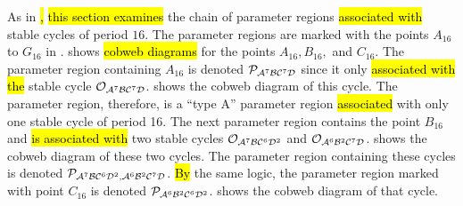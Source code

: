 As in\hl{ }\cite{akyuz2022}\hl{,} \hl{this section examines} the chain of parameter regions \hl{associated with} stable cycles of period $16$.
The parameter regions are marked with the points $A_{16}$ to $G_{16}$ in .
 shows \hl{cobweb diagrams} for the points $A_{16}, B_{16},$ and $C_{16}$.
The parameter region containing $A_{16}$ is denoted $\mathcal{P}_{\mathcal{A}^7\mathcal{B}\mathcal{C}^7\mathcal{D}}$ since it only \hl{associated with the} stable cycle $\mathcal{O}_{\mathcal{A}^7\mathcal{B}\mathcal{C}^7\mathcal{D}}$.
 shows the cobweb diagram of this cycle.
The parameter region, therefore, is a ``type A'' parameter region \hl{associated} with only one stable cycle of period 16.
The next parameter region contains the point $B_{16}$ and \hl{is associated with} two stable cycles $\mathcal{O}_{\mathcal{A}^7\mathcal{B}\mathcal{C}^6\mathcal{D}^2}$ and $\mathcal{O}_{\mathcal{A}^6\mathcal{B}^2\mathcal{C}^7\mathcal{D}}$.
 shows the cobweb diagram of these two cycles.
The parameter region containing these cycles is denoted $\mathcal{P}_{\mathcal{A}^7\mathcal{B}\mathcal{C}^6\mathcal{D}^2, \mathcal{A}^6\mathcal{B}^2\mathcal{C}^7\mathcal{D}}$.
\hl{By} the same logic, the parameter region marked with point $C_{16}$ is denoted $\mathcal{P}_{\mathcal{A}^6\mathcal{B}^2\mathcal{C}^6\mathcal{D}^2}$.
 shows the cobweb diagram of that cycle.

